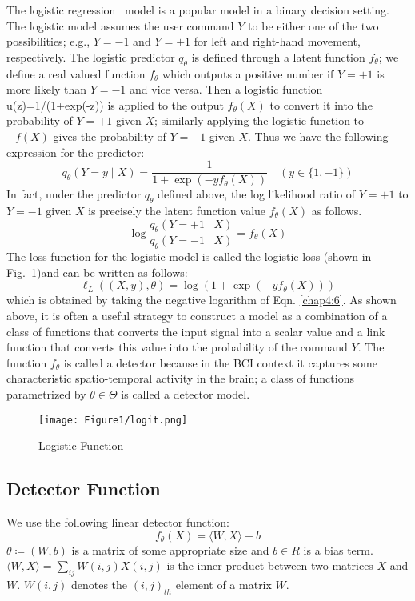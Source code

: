 The logistic regression~\cite{24} model is a popular model in a binary decision setting. The logistic model assumes the user command $Y$ to be either one of the two possibilities; e.g., $Y= -1$ and $Y= +1$ for left and right-hand movement, respectively. The logistic predictor $q_\theta$ is defined through a latent function $f_\theta$; we define a real valued function $f_\theta$ which outputs a positive number if $Y= +1$ is more likely than $Y= -1$ and vice versa. Then a logistic function  u(z)=1/(1+exp(-z)) is applied to the output $f_\theta(X)$ to convert it into the probability of $Y= +1$ given $X$; similarly applying the logistic function to  $- f(X)$ gives the probability of $Y= -1$ given $X$. Thus we have the following expression for the predictor:
\begin{equation}\label{eq46}
q_\theta\left(Y=y\mid X\right)=\frac{1}{1+\exp{\left(-y f_\theta\left(X\right)\right)}}\quad \left(y\in\lbrace 1,-1 \rbrace\right)
\end{equation}
In fact, under the predictor $q_\theta$  defined above, the log likelihood ratio of $Y= +1$ to $Y= -1$ given $X$ is precisely the latent function value $f_\theta(X)$ as follows.
\begin{equation} \label{chap4:6}
\log\frac{q_\theta\left(Y=+1\mid X\right)}{q_\theta\left(Y=-1\mid X\right)}=f_\theta\left(X\right)
\end{equation}
The loss function for the logistic model is called the logistic loss (shown in Fig.~\ref{logit})and can be written as follows:
\begin{equation} \label{eq48}
\ell_L\left(\left(X,y\right),\theta\right)=\log\left(1+\exp{\left(-y f_\theta\left(X\right)\right)}\right)
\end{equation} 
which is obtained by taking the negative logarithm of Eqn. \ref{chap4:6}. As shown above, it is often a useful strategy to construct a model as a combination of a class of functions that converts the input signal into a scalar value and a link function that converts this value into the probability of the command $Y$. The function $f_\theta$  is called a detector because in the BCI context it captures some characteristic spatio-temporal activity in the brain; a class of functions parametrized by $\theta \in \Theta$ is called a detector model.     
\begin{figure}
\centering
\texttt{[image: Figure1/logit.png]}
\caption{Logistic Function}
\label{logit}
\end{figure}
\subsection{Detector Function }
We use the following linear detector function:
\begin{equation}
f_\theta\left(X\right)=\langle W,X\rangle+b
\end{equation}
$\theta≔(W,b)$ is a matrix of some appropriate size and $b \in R$ is a bias term. 
$\langle W, X \rangle =\sum_{ij} W(i,j) X(i,j)$ is the inner product between two matrices $X$ and $W$. $W(i, j)$ denotes the $(i,j)_{th}$  element of a matrix $W$. 

